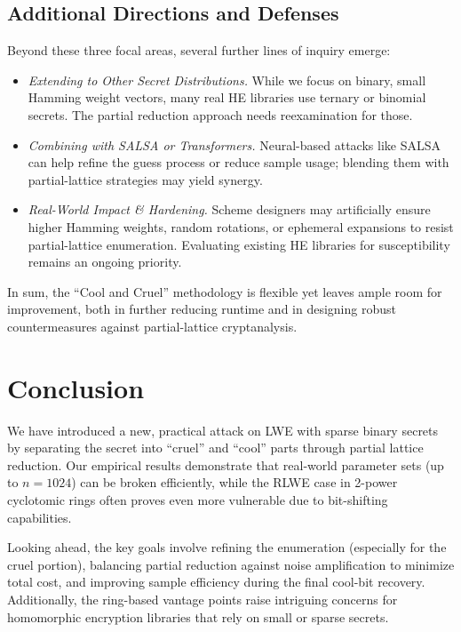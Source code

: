 \documentclass[11pt]{article}
\begin{document}
\subsection{Additional Directions and Defenses}

Beyond these three focal areas, several further lines of inquiry emerge:

\begin{itemize}
\item \emph{Extending to Other Secret Distributions.} While we focus on binary, small Hamming weight vectors, many real HE libraries use ternary or binomial secrets. The partial reduction approach needs reexamination for those.
\item \emph{Combining with SALSA or Transformers.} Neural-based attacks like SALSA can help refine the guess process or reduce sample usage; blending them with partial-lattice strategies may yield synergy.
\item \emph{Real-World Impact \& Hardening.} Scheme designers may artificially ensure higher Hamming weights, random rotations, or ephemeral expansions to resist partial-lattice enumeration. Evaluating existing HE libraries for susceptibility remains an ongoing priority.
\end{itemize}

\noindent In sum, the “Cool and Cruel” methodology is flexible yet leaves ample room for improvement, both in further reducing runtime and in designing robust countermeasures against partial-lattice cryptanalysis.

\section{Conclusion}
\label{sec:conclusion}

We have introduced a new, practical attack on LWE with sparse binary secrets by separating the secret into “cruel” and “cool” parts through partial lattice reduction. Our empirical results demonstrate that real‐world parameter sets (up to $n=1024$) can be broken efficiently, while the RLWE case in 2-power cyclotomic rings often proves even more vulnerable due to bit-shifting capabilities. 

Looking ahead, the key goals involve refining the enumeration (especially for the cruel portion), balancing partial reduction against noise amplification to minimize total cost, and improving sample efficiency during the final cool-bit recovery. Additionally, the ring-based vantage points raise intriguing concerns for homomorphic encryption libraries that rely on small or sparse secrets.
\end{document}
